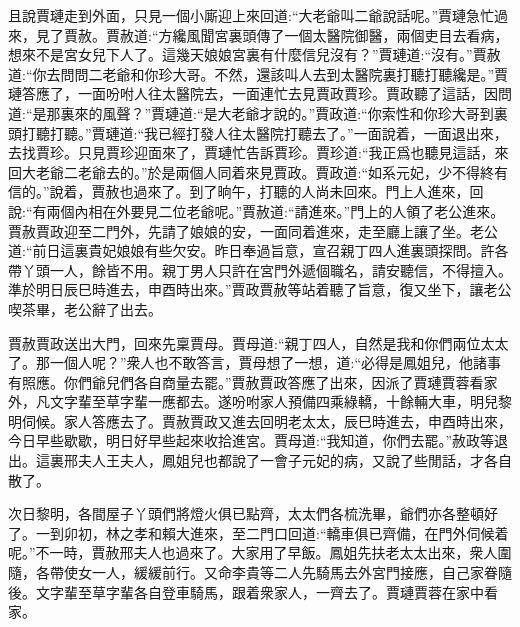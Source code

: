 \begin{parag}
    且說賈璉走到外面，只見一個小廝迎上來回道:“大老爺叫二爺說話呢。”賈璉急忙過來，見了賈赦。賈赦道:“方纔風聞宮裏頭傳了一個太醫院御醫，兩個吏目去看病，想來不是宮女兒下人了。這幾天娘娘宮裏有什麼信兒沒有？”賈璉道:“沒有。”賈赦道:“你去問問二老爺和你珍大哥。不然，還該叫人去到太醫院裏打聽打聽纔是。”賈璉答應了，一面吩咐人往太醫院去，一面連忙去見賈政賈珍。賈政聽了這話，因問道:“是那裏來的風聲？”賈璉道:“是大老爺才說的。”賈政道:“你索性和你珍大哥到裏頭打聽打聽。”賈璉道:“我已經打發人往太醫院打聽去了。”一面說着，一面退出來，去找賈珍。只見賈珍迎面來了，賈璉忙告訴賈珍。賈珍道:“我正爲也聽見這話，來回大老爺二老爺去的。”於是兩個人同着來見賈政。賈政道:“如系元妃，少不得終有信的。”說着，賈赦也過來了。到了晌午，打聽的人尚未回來。門上人進來，回說:“有兩個內相在外要見二位老爺呢。”賈赦道:“請進來。”門上的人領了老公進來。賈赦賈政迎至二門外，先請了娘娘的安，一面同着進來，走至廳上讓了坐。老公道:“前日這裏貴妃娘娘有些欠安。昨日奉過旨意，宣召親丁四人進裏頭探問。許各帶丫頭一人，餘皆不用。親丁男人只許在宮門外遞個職名，請安聽信，不得擅入。準於明日辰巳時進去，申酉時出來。”賈政賈赦等站着聽了旨意，復又坐下，讓老公喫茶畢，老公辭了出去。
\end{parag}


\begin{parag}
    賈赦賈政送出大門，回來先稟賈母。賈母道:“親丁四人，自然是我和你們兩位太太了。那一個人呢？”衆人也不敢答言，賈母想了一想，道:“必得是鳳姐兒，他諸事有照應。你們爺兒們各自商量去罷。”賈赦賈政答應了出來，因派了賈璉賈蓉看家外，凡文字輩至草字輩一應都去。遂吩咐家人預備四乘綠轎，十餘輛大車，明兒黎明伺候。家人答應去了。賈赦賈政又進去回明老太太，辰巳時進去，申酉時出來，今日早些歇歇，明日好早些起來收拾進宮。賈母道:“我知道，你們去罷。”赦政等退出。這裏邢夫人王夫人，鳳姐兒也都說了一會子元妃的病，又說了些閒話，才各自散了。
\end{parag}


\begin{parag}
    次日黎明，各間屋子丫頭們將燈火俱已點齊，太太們各梳洗畢，爺們亦各整頓好了。一到卯初，林之孝和賴大進來，至二門口回道:“轎車俱已齊備，在門外伺候着呢。”不一時，賈赦邢夫人也過來了。大家用了早飯。鳳姐先扶老太太出來，衆人圍隨，各帶使女一人，緩緩前行。又命李貴等二人先騎馬去外宮門接應，自己家眷隨後。文字輩至草字輩各自登車騎馬，跟着衆家人，一齊去了。賈璉賈蓉在家中看家。
\end{parag}


